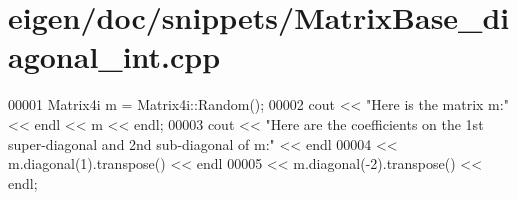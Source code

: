 \hypertarget{eigen_2doc_2snippets_2_matrix_base__diagonal__int_8cpp_source}{}\section{eigen/doc/snippets/\+Matrix\+Base\+\_\+diagonal\+\_\+int.cpp}
\label{eigen_2doc_2snippets_2_matrix_base__diagonal__int_8cpp_source}

\begin{DoxyCode}
00001 Matrix4i m = Matrix4i::Random();
00002 cout << \textcolor{stringliteral}{"Here is the matrix m:"} << endl << m << endl;
00003 cout << \textcolor{stringliteral}{"Here are the coefficients on the 1st super-diagonal and 2nd sub-diagonal of m:"} << endl
00004      << m.diagonal(1).transpose() << endl
00005      << m.diagonal(-2).transpose() << endl;
\end{DoxyCode}
